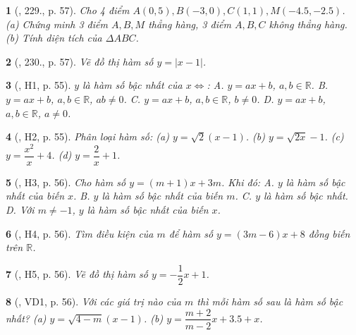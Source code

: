 \documentclass{article}
\newtheorem{baitoan}{}
\begin{document}
\begin{baitoan}[\cite{Tuyen_Toan_8}, 229., p. 57]
	Cho 4 điểm $A(0,5),B(-3,0),C(1,1),M(-4.5,-2.5)$. (a) Chứng minh 3 điểm $A,B,M$ thẳng hàng, 3 điểm $A,B,C$ không thẳng hàng. (b) Tính diện tích của $\Delta ABC$.
\end{baitoan}

\begin{baitoan}[\cite{Tuyen_Toan_8}, 230., p. 57]
	Vẽ đồ thị hàm số $y = |x - 1|$.
\end{baitoan}

\begin{baitoan}[\cite{Binh_boi_duong_Toan_9_tap_1}, H1, p. 55]
	$y$ là hàm số bậc nhất của $x\Leftrightarrow$: {\sf A.} $y = ax + b$, $a,b\in\mathbb{R}$. {\sf B.} $y = ax + b$, $a,b\in\mathbb{R}$, $ab\ne0$. {\sf C.} $y = ax + b$, $a,b\in\mathbb{R}$, $b\ne0$. {\sf D.} $y = ax + b$, $a,b\in\mathbb{R}$, $a\ne0$.
\end{baitoan}

\begin{baitoan}[\cite{Binh_boi_duong_Toan_9_tap_1}, H2, p. 55]
	Phân loại hàm số: (a) $y = \sqrt{2}(x - 1)$. (b) $y = \sqrt{2x} - 1$. (c) $y = \dfrac{x^2}{x} + 4$. (d) $y = \dfrac{2}{x} + 1$.
\end{baitoan}

\begin{baitoan}[\cite{Binh_boi_duong_Toan_9_tap_1}, H3, p. 56]
	Cho hàm số $y = (m + 1)x + 3m$. Khi đó: {\sf A.} $y$ là hàm số bậc nhất của biến $x$. {\sf B.} $y$ là hàm số bậc nhất của biến $m$. {\sf C.} $y$ là hàm số bậc nhất. {\sf D.} Với $m\ne-1$, $y$ là hàm số bậc nhất của biến $x$.
\end{baitoan}

\begin{baitoan}[\cite{Binh_boi_duong_Toan_9_tap_1}, H4, p. 56]
	Tìm điều kiện của $m$ để hàm số $y = (3m - 6)x + 8$ đồng biến trên $\mathbb{R}$.
\end{baitoan}

\begin{baitoan}[\cite{Binh_boi_duong_Toan_9_tap_1}, H5, p. 56]
	Vẽ đồ thị hàm số $y = -\dfrac{1}{2}x + 1$.
\end{baitoan}

\begin{baitoan}[\cite{Binh_boi_duong_Toan_9_tap_1}, VD1, p. 56]
	Với các giá trị nào của $m$ thì mỗi hàm số sau là hàm số bậc nhất? (a) $y = \sqrt{4 - m}(x - 1)$. (b) $y = \dfrac{m + 2}{m - 2}x + 3.5 + x$.
\end{baitoan}
\end{document}
